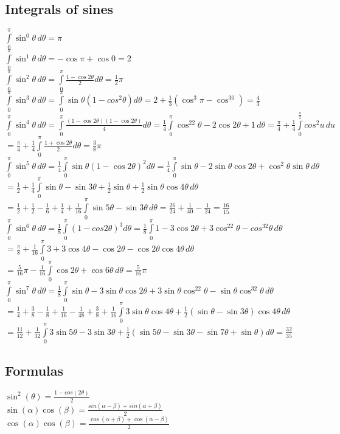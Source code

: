 \documentclass [letterpaper]{article}
\begin{document}
\subsection{\label{ss:sines}Integrals of sines}
$\int\limits_0^\pi\sin^0\theta\,d\theta=\pi$\\
$\int\limits_0^\pi\sin^1\theta\,d\theta=-\cos\pi+\cos 0=2$\\
$\int\limits_0^\pi\sin^2\theta\,d\theta=\int\limits_0^\pi\frac{1-\cos 2\theta}{2}d\theta=\frac{1}{2}\pi$\\
$\int\limits_0^\pi\sin^3\theta\,d\theta=\int\limits_0^\pi\sin\theta(1-cos^2\theta)d\theta=2+\frac{1}{3}(\cos^3\pi-\cos^30)=\frac{4}{3}$\\
$\int\limits_0^\pi\sin^4\theta\,d\theta=\int\limits_0^\pi\frac{(1-\cos2\theta)(1-\cos2\theta)}{4}d\theta=\frac{1}{4}\int\limits_0^\pi\cos^22\theta-2\cos2\theta+1\,d\theta=\frac{\pi}{4}+\frac{1}{4}\int\limits_0^\frac{\pi}{2}cos^2u\,du$\\
$=\frac{\pi}{4}+\frac{1}{4}\int\limits_0^\pi\frac{1+\cos2\theta}{2}d\theta=\frac{3}{8}\pi$\\
$\int\limits_0^\pi\sin^5\theta\,d\theta=\frac{1}{4}\int\limits_0^\pi\sin\theta(1-\cos2\theta)^2d\theta=\frac{1}{4}\int\limits_0^\pi\sin\theta-2\sin\theta\cos2\theta+\cos^2\theta\sin\theta\,d\theta$\\
$=\frac{1}{2}+\frac{1}{4}\int\limits_0^\pi\sin\theta-\sin3\theta+\frac{1}{2}\sin\theta+\frac{1}{2}\sin\theta\cos4\theta\,d\theta$\\
$=\frac{1}{2}+\frac{1}{2}-\frac{1}{6}+\frac{1}{4}+\frac{1}{16}\int\limits_0^\pi\sin5\theta-\sin3\theta\,d\theta=\frac{26}{24}+\frac{1}{40}-\frac{1}{24}=\frac{16}{15}$\\
$\int\limits_0^\pi\sin^6\theta\,d\theta=\frac{1}{8}\int\limits_0^\pi(1-cos2\theta)^3d\theta=\frac{1}{8}\int\limits_0^\pi1-3\cos2\theta+3\cos^22\theta-cos^32\theta\,d\theta$\\
$=\frac{\pi}{8}+\frac{1}{16}\int\limits_0^\pi3+3\cos4\theta-\cos2\theta-\cos2\theta\cos4\theta\,d\theta$\\
$=\frac{5}{16}\pi-\frac{1}{16}\int\limits_0^\pi\cos2\theta+\cos6\theta\,d\theta=\frac{5}{16}\pi$\\
$\int\limits_0^\pi\sin^7\theta\,d\theta=\frac{1}{8}\int\limits_0^\pi\sin\theta-3\sin\theta\cos2\theta+3\sin\theta\cos^22\theta-\sin\theta\cos^32\theta\,d\theta$\\
$=\frac{1}{4}+\frac{3}{8}-\frac{1}{8}+\frac{1}{16}-\frac{1}{48}+\frac{3}{8}+\frac{1}{16}\int\limits_0^\pi3\sin\theta\cos4\theta+\frac{1}{2}(\sin\theta-\sin3\theta)\cos4\theta\,d\theta$\\
$=\frac{11}{12}+\frac{1}{32}\int\limits_0^\pi3\sin5\theta-3\sin3\theta+\frac{1}{2}(\sin5\theta-\sin3\theta-\sin7\theta+\sin\theta)d\theta=\frac{32}{35}$
\subsection{Formulas}
$\sin^2(\theta)=\frac{1-cos(2\theta)}{2}$\\
$\sin(\alpha)\cos(\beta) = \frac{sin(\alpha - \beta) + sin(\alpha + \beta)}{2}$\\
$\cos(\alpha)\cos(\beta) = \frac{\cos(\alpha+\beta)+\cos(\alpha-\beta)}{2}$ ~\cite{calcbk}\\
{}

\end{document}
